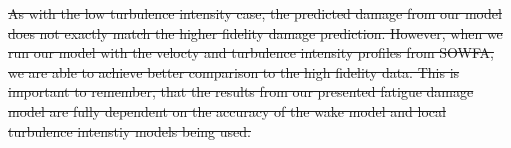 \documentclass[11pt,letterpaper]{article}
\providecommand{\DIFdel}[1]{{\protect\color{red}\sout{#1}}}                      %
\providecommand{\DIFdelbegin}{} %
\providecommand{\DIFdelend}{} %
\newcommand{\DIFscaledelfig}{0.5}
\newlength{\DIFdelgraphicswidth} %
\newlength{\DIFdelgraphicsheight} %
\newcommand{\DIFdelincludegraphics}[2][]{%
\sbox{\DIFdelgraphicsbox}{\DIFOincludegraphics[#1]{#2}}%
\settoboxwidth{\DIFdelgraphicswidth}{\DIFdelgraphicsbox} %
\settoboxtotalheight{\DIFdelgraphicsheight}{\DIFdelgraphicsbox} %
\scalebox{\DIFscaledelfig}{%
\parbox[b]{\DIFdelgraphicswidth}{\usebox{\DIFdelgraphicsbox}\\[-\baselineskip] \rule{\DIFdelgraphicswidth}{0em}}\llap{\resizebox{\DIFdelgraphicswidth}{\DIFdelgraphicsheight}{%
\setlength{\unitlength}{\DIFdelgraphicswidth}%
\begin{picture}(1,1)%
\thicklines\linethickness{2pt} %
{\color[rgb]{1,0,0}\put(0,0){\framebox(1,1){}}}%
{\color[rgb]{1,0,0}\put(0,0){\line( 1,1){1}}}%
{\color[rgb]{1,0,0}\put(0,1){\line(1,-1){1}}}%
\end{picture}%
}\hspace*{3pt}}} %
} %
\DeclareRobustCommand{\DIFdelbegin}{\DIFOdelbegin \let\includegraphics\DIFdelincludegraphics} %
\DeclareRobustCommand{\DIFdelend}{\DIFOaddend \let\includegraphics\DIFOincludegraphics} %
\begin{document}
% 
\DIFdelbegin \DIFdel{As with the low turbulence intensity case, the predicted damage from our model does not exactly match the higher fidelity damage prediction. However, when we run our model with the velocty and turbulence intensity profiles from SOWFA, we are able to achieve better comparison to the high fidelity data. This is important to remember, that the results from our presented fatigue damage model are fully dependent on the accuracy of the wake model and local turbulence intenstiy models being used.
}\DIFdelend %

% 
\end{document}
